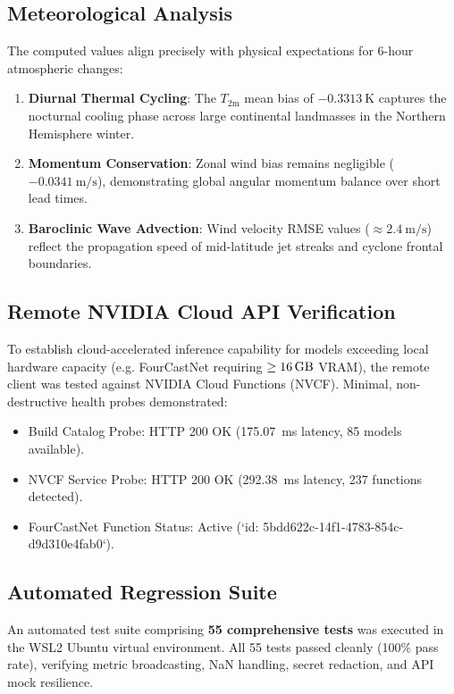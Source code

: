 \documentclass[10pt,journal,compsoc]{IEEEtran}
\begin{document}
\subsection{Meteorological Analysis}
The computed values align precisely with physical expectations for 6-hour atmospheric changes:
\begin{enumerate}
    \item \textbf{Diurnal Thermal Cycling}: The $T_{2\text{m}}$ mean bias of $\SI{-0.3313}{\kelvin}$ captures the nocturnal cooling phase across large continental landmasses in the Northern Hemisphere winter.
    \item \textbf{Momentum Conservation}: Zonal wind bias remains negligible ($\SI{-0.0341}{\metre\per\second}$), demonstrating global angular momentum balance over short lead times.
    \item \textbf{Baroclinic Wave Advection}: Wind velocity RMSE values ($\approx \SI{2.4}{\metre\per\second}$) reflect the propagation speed of mid-latitude jet streaks and cyclone frontal boundaries.
\end{enumerate}

\subsection{Remote NVIDIA Cloud API Verification}
To establish cloud-accelerated inference capability for models exceeding local hardware capacity (e.g. FourCastNet requiring $\ge \SI{16}{\giga\byte}$ VRAM), the remote client was tested against NVIDIA Cloud Functions (NVCF). Minimal, non-destructive health probes demonstrated:
\begin{itemize}
    \item Build Catalog Probe: HTTP 200 OK (\SI{175.07}{\milli\second} latency, 85 models available).
    \item NVCF Service Probe: HTTP 200 OK (\SI{292.38}{\milli\second} latency, 237 functions detected).
    \item FourCastNet Function Status: Active (`id: 5bdd622c-14f1-4783-854c-d9d310e4fab0`).
\end{itemize}

\subsection{Automated Regression Suite}
An automated test suite comprising \textbf{55 comprehensive tests} was executed in the WSL2 Ubuntu virtual environment. All 55 tests passed cleanly (100\% pass rate), verifying metric broadcasting, NaN handling, secret redaction, and API mock resilience.
\end{document}
